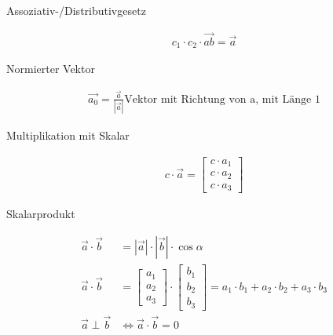 \begin{sectionbox}
	Assoziativ-/Distributivgesetz
	\begin{emphbox}
		\begin{align*}
			c_1 \cdot c_2 \cdot \overrightarrow{ab} = \overrightarrow{a}
		\end{align*}
	\end{emphbox}


	Normierter Vektor
	\begin{emphbox}
		\begin{align*}
			\overrightarrow{a_0} = \frac{\overrightarrow{a}}{|\overrightarrow{a}|} \text{Vektor mit Richtung von a, mit Länge 1}
		\end{align*}
	\end{emphbox}

	Multiplikation mit Skalar
	\begin{emphbox}
		\begin{align*}
			c \cdot \overrightarrow{a} = \begin{bmatrix} c \cdot a_1 \\ c \cdot a_2 \\ c \cdot a_3 \end{bmatrix}
		\end{align*}
	\end{emphbox}

	Skalarprodukt
	\begin{emphbox}
		\begin{align*}
			\overrightarrow{a} \cdot \overrightarrow{b} &= |\overrightarrow{a}| \cdot |\overrightarrow{b}| \cdot \cos \alpha \\
			\overrightarrow{a} \cdot \overrightarrow{b} &= \begin{bmatrix} a_1 \\ a_2 \\ a_3 \end{bmatrix} \cdot \begin{bmatrix} b_1 \\ b_2 \\ b_3 \end{bmatrix} = a_1 \cdot b_1 + a_2 \cdot b_2 + a_3 \cdot b_3 \\
			\overrightarrow{a} \perp \overrightarrow{b} &\Leftrightarrow \overrightarrow{a} \cdot \overrightarrow{b} = 0 
		\end{align*}
	\end{emphbox}


\end{sectionbox}
